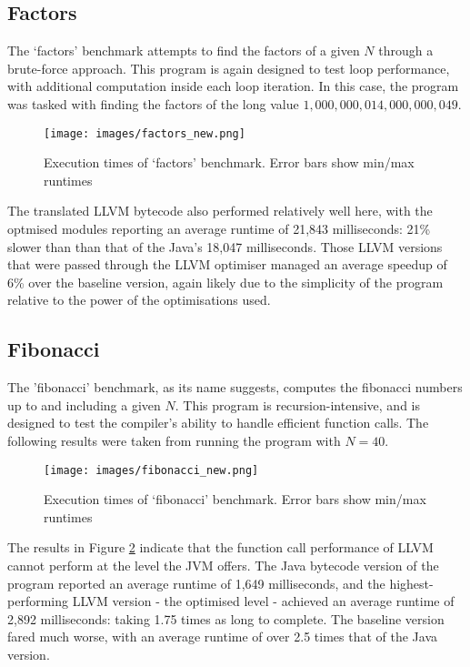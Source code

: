 \subsection*{Factors}

The `factors' benchmark attempts to find the factors of a given $N$ through a brute-force approach. This program is again designed to test loop performance, with additional computation inside each loop iteration. In this case, the program was tasked with finding the factors of the long value $1,000,000,014,000,000,049$.

\begin{figure}[h!]
    \centering
    \texttt{[image: images/factors\_new.png]}
    \caption[Execution times of `factors' benchmark]{Execution times of `factors' benchmark. Error bars show min/max runtimes}
    \label{fig:res_factors}
\end{figure}

The translated LLVM bytecode also performed relatively well here, with the optmised modules reporting an average runtime of 21,843 milliseconds: 21\% slower than than that of the Java's 18,047 milliseconds. Those LLVM versions that were passed through the LLVM optimiser managed an average speedup of 6\% over the baseline version, again likely due to the simplicity of the program relative to the power of the optimisations used.


\subsection*{Fibonacci}

The 'fibonacci' benchmark, as its name suggests, computes the fibonacci numbers up to and including a given $N$. This program is recursion-intensive, and is designed to test the compiler's ability to handle efficient function calls. The following results were taken from running the program with $N = 40$.

\begin{figure}[h!]
    \centering
    \texttt{[image: images/fibonacci\_new.png]}
    \caption[Execution times of `fibonacci' benchmark]{Execution times of `fibonacci' benchmark. Error bars show min/max runtimes}
    \label{fig:res_fibonacci}
\end{figure}

The results in Figure \ref{fig:res_fibonacci} indicate that the function call performance of LLVM cannot perform at the level the JVM offers. The Java bytecode version of the program reported an average runtime of 1,649 milliseconds, and the highest-performing LLVM version - the optimised level - achieved an average runtime of 2,892 milliseconds: taking 1.75 times as long to complete. The baseline version fared much worse, with an average runtime of over 2.5 times that of the Java version.


